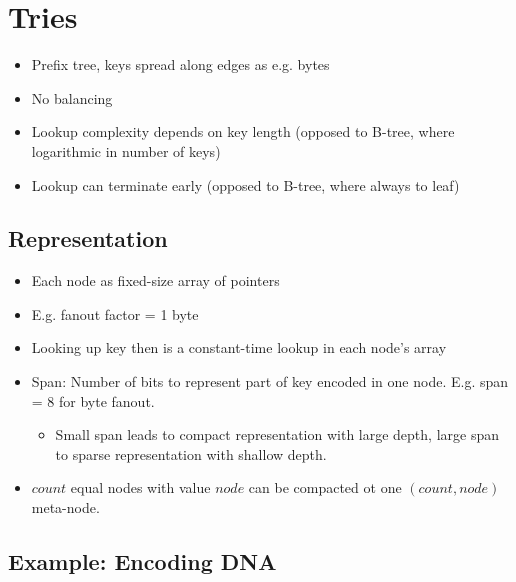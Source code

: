 \documentclass[a4paper]{scrreprt}
\begin{document}
\section{Tries}

\begin{itemize}
		\item Prefix tree, keys spread along edges as e.g. bytes
		\item No balancing
		\item Lookup complexity depends on key length (opposed to B-tree, where logarithmic in number of keys)
		\item Lookup can terminate early (opposed to B-tree, where always to leaf)
\end{itemize}

\subsection{Representation}

\begin{itemize}
		\item Each node as fixed-size array of pointers
		\item E.g. fanout factor = 1 byte
		\item Looking up key then is a constant-time lookup in each node's array
		\item Span: Number of bits to represent part of key encoded in one
				node. E.g. span = 8 for byte fanout.
				\begin{itemize}
						\item Small span leads to compact representation with
								large depth, large span to sparse
								representation with shallow depth.
				\end{itemize}
		\item $count$ equal nodes with value $node$ can be compacted ot one
				$(count, node)$ meta-node.
\end{itemize}

\subsection{Example: Encoding DNA}
\end{document}
